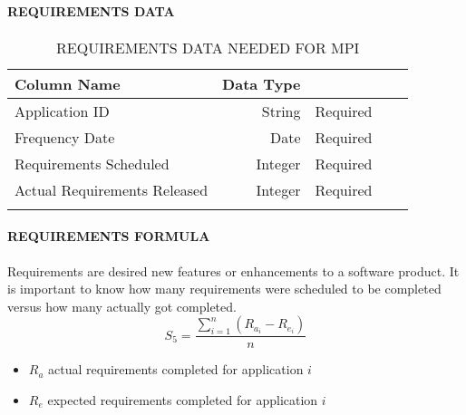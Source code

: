 \documentclass[SDSUThesis.tex]{subfiles}
\begin{document}
            \paragraph{REQUIREMENTS DATA}
            
                \begin{longtable}{@{}l rr rr}
                    \toprule%
                     \centering%
                     {\bfseries Column Name}
                     & {\bfseries Data Type}
                     &  \\
                    
                    \cmidrule[0.4pt](r{0.125em}){1-1}%
                    \cmidrule[0.4pt](lr{0.125em}){2-2}%
                    \cmidrule[0.4pt](l{0.125em}){3-3}%
                    \endhead
                    
                    Application ID & String  & Required \\
                    \myrowcolour%
                    Frequency Date & Date & Required \\
                    Requirements Scheduled & Integer & Required \\
                    \myrowcolour%
                    Actual Requirements Released & Integer  & Required \\
                    
                    \bottomrule
                    
                    \caption{REQUIREMENTS DATA NEEDED FOR MPI}
                    \label{tab:req}
                \end{longtable}
            
            \paragraph{REQUIREMENTS FORMULA}
                Requirements are desired new features or enhancements 
                to a software product.  It is important to know how many requirements
                were scheduled to be completed versus how many actually got completed.  
                \[
                    S_5 = \frac{\sum^n_{i=1}\left( R_{a_i} - R_{e_i} \right)}{n}
                \]
                \begin{itemize}
                    \item $R_a$ actual requirements completed for application $i$
                    \item $R_e$ expected requirements completed for application $i$
                \end{itemize}
            
\end{document}

